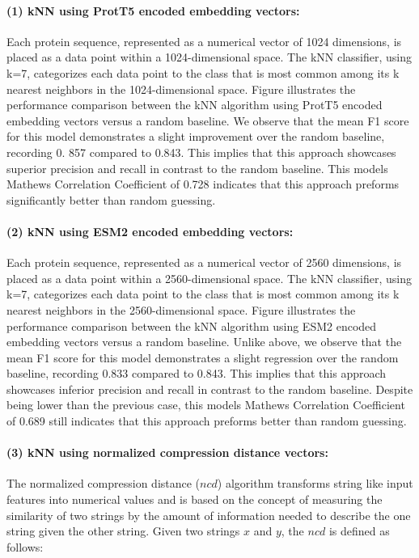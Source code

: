 \documentclass{bioinfo}
\begin{document}
\paragraph{(1) kNN using ProtT5 encoded embedding vectors:}

Each protein sequence, represented as a numerical vector of 1024 dimensions, is placed as a data 
point within a 1024-dimensional space. The kNN classifier, using k=7,
categorizes each data point to the class that is most common among its k nearest neighbors in the 1024-dimensional space.
Figure 
illustrates the performance comparison between the kNN algorithm using ProtT5 encoded embedding vectors versus a random baseline. 
We observe that the mean F1 score for this model demonstrates a slight improvement over the random baseline,
recording 0. 857 compared to 0.843. This implies that this approach showcases superior precision and recall in contrast to the random baseline.
This models Mathews Correlation Coefficient of 0.728 indicates that this approach preforms significantly better than random guessing.


\paragraph{(2) kNN using ESM2 encoded embedding vectors:}
Each protein sequence, represented as a numerical vector of 2560 dimensions, is placed as a data point within a 2560-dimensional space.
The kNN classifier, using k=7, categorizes each data point to the class that is most common among its k nearest neighbors in the 2560-dimensional space.
Figure 
illustrates the performance comparison between the kNN algorithm using ESM2 encoded embedding vectors versus a random baseline.
Unlike above, we observe that the mean F1 score for this model demonstrates a slight regression over the random baseline, recording 0.833
compared to 0.843. This implies that this approach showcases inferior precision and recall in contrast to the random baseline.
Despite being lower than the previous case, this models Mathews Correlation Coefficient of 0.689 still indicates that this approach preforms 
better than random guessing.

\paragraph{(3) kNN using normalized compression distance vectors:}
The normalized compression distance ($ncd$) algorithm transforms string like input features into numerical values and is based on the concept of measuring 
the similarity of two strings by the amount of information needed to describe the one string given the other string. 
Given two strings $x$ and $y$, the $ncd$ is defined as follows:
\end{document}
